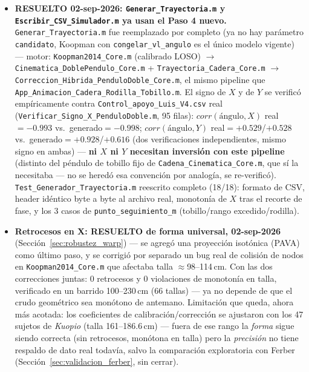 \documentclass[11pt,a4paper]{scrartcl}
\begin{document}
\begin{itemize}
    \item \textbf{RESUELTO 02-sep-2026: \texttt{Generar\_Trayectoria.m} y \texttt{Escribir\_CSV\_Simulador.m} ya usan el Paso 4 nuevo.} \texttt{Generar\_Trayectoria.m} fue reemplazado por completo (ya no hay parámetro \texttt{candidato}, Koopman con \texttt{congelar\_vl\_angulo} es el único modelo vigente) --- motor: \texttt{Koopman2014\_Core.m} (calibrado LOSO) $\to$ \texttt{Cinematica\_DoblePendulo\_Core.m} + \texttt{Trayectoria\_Cadera\_Core.m} $\to$ \texttt{Correccion\_Hibrida\_PenduloDoble\_Core.m}, el mismo pipeline que \texttt{App\_Animacion\_Cadera\_Rodilla\_Tobillo.m}. El signo de $X$ y de $Y$ se verificó empíricamente contra \texttt{Control\_apoyo\_Luis\_V4.csv} real (\texttt{Verificar\_Signo\_X\_PenduloDoble.m}, 95 filas): $corr(\text{ángulo},X)$ real$=-0.993$ vs.\ generado$=-0.998$; $corr(\text{ángulo},Y)$ real$=+0.529$/$+0.528$ vs.\ generado$=+0.928$/$+0.616$ (dos verificaciones independientes, mismo signo en ambas) --- \textbf{ni $X$ ni $Y$ necesitan inversión con este pipeline} (distinto del péndulo de tobillo fijo de \texttt{Cadena\_Cinematica\_Core.m}, que sí la necesitaba --- no se heredó esa convención por analogía, se re-verificó). \texttt{Test\_Generador\_Trayectoria.m} reescrito completo (18/18): formato de CSV, header idéntico byte a byte al archivo real, monotonía de $X$ tras el recorte de fase, y los 3 casos de \texttt{punto\_seguimiento\_m} (tobillo/rango excedido/rodilla).

    \item \textbf{Retrocesos en X: RESUELTO de forma universal, 02-sep-2026} (Sección~\ref{sec:robustez_warp}) --- se agregó una proyección isotónica (PAVA) como último paso, y se corrigió por separado un bug real de colisión de nodos en \texttt{Koopman2014\_Core.m} que afectaba talla $\approx$98--114\,cm. Con las dos correcciones juntas: 0 retrocesos y 0 violaciones de monotonía en talla, verificado en un barrido 100--230\,cm (66 tallas) --- ya no depende de que el crudo geométrico sea monótono de antemano. Limitación que queda, ahora más acotada: los coeficientes de calibración/corrección se ajustaron con los 47 sujetos de \emph{Kuopio} (talla 161--186.6\,cm) --- fuera de ese rango la \emph{forma} sigue siendo correcta (sin retrocesos, monótona en talla) pero la \emph{precisión} no tiene respaldo de dato real todavía, salvo la comparación exploratoria con Ferber (Sección~\ref{sec:validacion_ferber}, sin cerrar).


\end{itemize}
\end{document}
